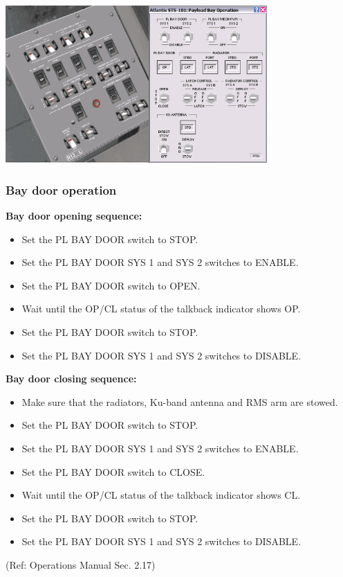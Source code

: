 \begin{center}
\includegraphics[width=0.75\textwidth]{Images//Pic7.png}
\end{center}

\subsubsection{Bay door operation}

\textbf{Bay door opening sequence:}
\begin{itemize} 
\item Set the PL BAY DOOR switch to STOP.
\item Set the PL BAY DOOR SYS 1 and SYS 2 switches to ENABLE.
\item Set the PL BAY DOOR switch to OPEN.
\item Wait until the OP/CL status of the talkback indicator shows OP.
\item Set the PL BAY DOOR switch to STOP.
\item Set the PL BAY DOOR SYS 1 and SYS 2 switches to DISABLE.
\end{itemize}

\textbf{Bay door closing sequence:}
\begin{itemize} 
\item Make sure that the radiators, Ku-band antenna and RMS arm are stowed.
\item Set the PL BAY DOOR switch to STOP.
\item Set the PL BAY DOOR SYS 1 and SYS 2 switches to ENABLE.
\item Set the PL BAY DOOR switch to CLOSE.
\item Wait until the OP/CL status of the talkback indicator shows CL.
\item Set the PL BAY DOOR switch to STOP.
\item Set the PL BAY DOOR SYS 1 and SYS 2 switches to DISABLE.
\end{itemize}
(Ref: Operations Manual Sec. 2.17)

